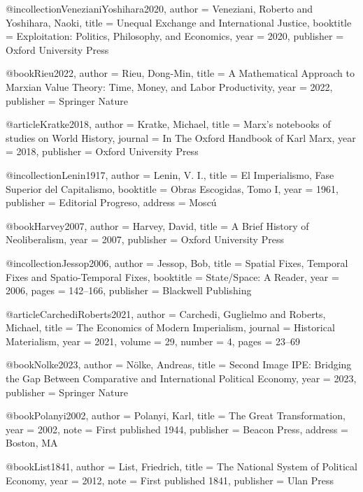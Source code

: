 @incollection{VenezianiYoshihara2020,
	author    = {Veneziani, Roberto and Yoshihara, Naoki},
	title     = {Unequal Exchange and International Justice},
	booktitle = {Exploitation: Politics, Philosophy, and Economics},
	year      = {2020},
	publisher = {Oxford University Press}
}

@book{Rieu2022,
	author    = {Rieu, Dong-Min},
	title     = {A Mathematical Approach to {Marxian} Value Theory: Time, Money, and Labor Productivity},
	year      = {2022},
	publisher = {Springer Nature}
}

@article{Kratke2018,
	author  = {Kratke, Michael},
	title   = {Marx's notebooks of studies on World History},
	journal = {In The Oxford Handbook of Karl Marx},
	year    = {2018},
	publisher = {Oxford University Press}
}

@incollection{Lenin1917,
	author    = {Lenin, V. I.},
	title     = {El Imperialismo, Fase Superior del Capitalismo},
	booktitle = {Obras Escogidas, Tomo I},
	year      = {1961},
	publisher = {Editorial Progreso},
	address   = {Mosc{\'u}}
}

@book{Harvey2007,
	author    = {Harvey, David},
	title     = {A Brief History of Neoliberalism},
	year      = {2007},
	publisher = {Oxford University Press}
}

@incollection{Jessop2006,
	author    = {Jessop, Bob},
	title     = {Spatial Fixes, Temporal Fixes and Spatio-Temporal Fixes},
	booktitle = {State/Space: A Reader},
	year      = {2006},
	pages     = {142--166},
	publisher = {Blackwell Publishing}
}

@article{CarchediRoberts2021,
	author  = {Carchedi, Guglielmo and Roberts, Michael},
	title   = {The Economics of Modern Imperialism},
	journal = {Historical Materialism},
	year    = {2021},
	volume  = {29},
	number  = {4},
	pages   = {23--69}
}

@book{Nolke2023,
	author    = {N{\"o}lke, Andreas},
	title     = {Second Image {IPE}: Bridging the Gap Between Comparative and International Political Economy},
	year      = {2023},
	publisher = {Springer Nature}
}

@book{Polanyi2002,
	author    = {Polanyi, Karl},
	title     = {The Great Transformation},
	year      = {2002},
	note      = {First published 1944},
	publisher = {Beacon Press},
	address   = {Boston, MA}
}

@book{List1841,
	author    = {List, Friedrich},
	title     = {The National System of Political Economy},
	year      = {2012},
	note      = {First published 1841},
	publisher = {Ulan Press}
}

